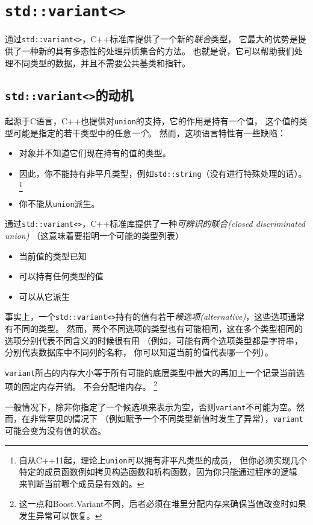 \chapter{\texttt{std::variant<>}}\label{ch16}
通过\texttt{std::variant<>}，C++标准库提供了一个新的\emph{联合}类型，
它最大的优势是提供了一种新的具有多态性的处理异质集合的方法。
也就是说，它可以帮助我们处理不同类型的数据，并且不需要公共基类和指针。


\section{\texttt{std::variant<>}的动机}
起源于C语言，C++也提供对\texttt{union}的支持，它的作用是持有一个值，
这个值的类型可能是指定的若干类型中的任意\emph{一个}。
然而，这项语言特性有一些缺陷：
\begin{itemize}
    \item 对象并不知道它们现在持有的值的类型。
    \item 因此，你不能持有非平凡类型，例如\texttt{std::string}（没有进行特殊处理的话）。
    \footnote{自从C++11起，理论上\texttt{union}可以拥有非平凡类型的成员，
    但你必须实现几个特定的成员函数例如拷贝构造函数和析构函数，因为你只能通过程序的逻辑
    来判断当前哪个成员是有效的。}
    \item 你不能从\texttt{union}派生。
\end{itemize}
通过\texttt{std::variant<>}，C++标准库提供了一种\emph{可辨识的联合(closed discriminated union)}
（这意味着要指明一个可能的类型列表）
\begin{itemize}
    \item 当前值的类型已知
    \item 可以持有任何类型的值
    \item 可以从它派生
\end{itemize}
事实上，一个\texttt{std::variant<>}持有的值有若干\emph{候选项(alternative)}，这些选项通常有不同的类型。
然而，两个不同选项的类型也有可能相同，这在多个类型相同的选项分别代表不同含义的时候很有用
（例如，可能有两个选项类型都是字符串，分别代表数据库中不同列的名称，
你可以知道当前的值代表哪一个列）。

\texttt{variant}所占的内存大小等于所有可能的底层类型中最大的再加上一个记录当前选项的固定内存开销。
不会分配堆内存。
\footnote{这一点和Boost.Variant不同，后者必须在堆里分配内存来确保当值改变时如果发生异常可以恢复。}

一般情况下，除非你指定了一个候选项来表示为空，否则\texttt{variant}不可能为空。然而，在非常罕见的情况下
（例如赋予一个不同类型新值时发生了异常），\texttt{variant}可能会变为没有值的状态。

